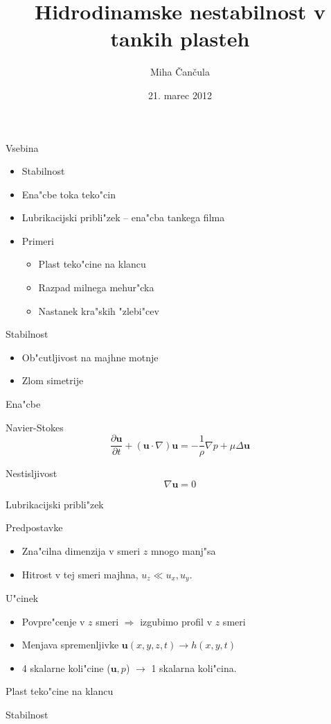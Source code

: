 \documentclass{beamer}
\date{21. marec 2012}
\title{Hidrodinamske nestabilnost v tankih plasteh}
\author{Miha \v Can\v cula}
\renewcommand{\vec}{\mathbf}
\begin{document}
\frame{\titlepage}

\begin{frame}{Vsebina}
 \begin{itemize}
  \item Stabilnost
  \item Ena"cbe toka teko"cin
  \item Lubrikacijski pribli"zek -- ena"cba tankega filma
  \item Primeri
  \begin{itemize}
    \item{Plast teko"cine na klancu}
    \item{Razpad milnega mehur"cka}
    \item{Nastanek kra"skih "zlebi"cev}
  \end{itemize}
 \end{itemize}
\end{frame}


\begin{frame}{Stabilnost}
 \begin{itemize}
 \item Ob"cutljivost na majhne motnje
 \item Zlom simetrije
 \end{itemize}
\end{frame}

\begin{frame}{Ena"cbe}

\begin{block}{Navier-Stokes}
\[ \frac{\partial \vec u}{\partial t} + (\vec u \cdot \nabla) \vec u = -\frac{1}{\rho}\nabla p + \mu \Delta \vec u \] 
\end{block}
\begin{block}{Nestisljivost}
\[ \nabla \vec u = 0 \]
\end{block}

\end{frame}

\begin{frame}{Lubrikacijski pribli"zek}
 \begin{block}{Predpostavke}
  \begin{itemize}
   \item Zna"cilna dimenzija v smeri $z$ mnogo manj"sa
   \item Hitrost v tej smeri majhna, $u_z \ll u_x, u_y$. 
  \end{itemize}
  \end{block}
  
  \begin{block}{U"cinek}
  \begin{itemize}
   \item Povpre"cenje v $z$ smeri $\Rightarrow$ izgubimo profil v $z$ smeri
   \item Menjava spremenljivke $\vec u(x,y,z,t) \to h(x,y,t)$
   \item 4 skalarne koli"cine ($\vec u, p$) $\to$ 1 skalarna koli"cina. 
   \end{itemize}
 \end{block}

\end{frame}

\begin{frame}{Plast teko"cine na klancu}
 
\end{frame}

\begin{frame}{Stabilnost}
 
\end{frame}
\end{document}
